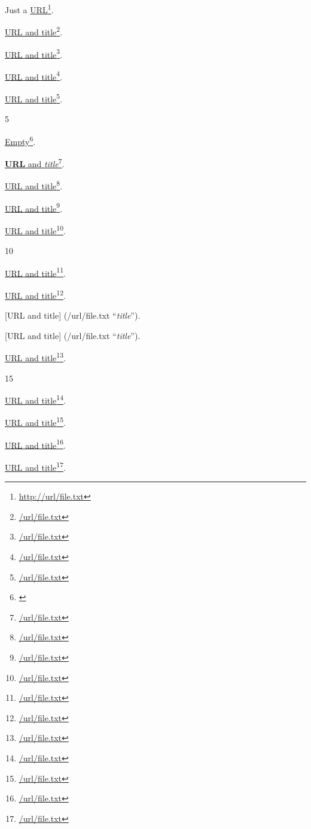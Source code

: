Just a \href{http://url/file.txt}{URL}\footnote{\href{http://url/file.txt}{http:\slash \slash url\slash file.txt}}.

\href{/url/file.txt}{URL and title}\footnote{\href{/url/file.txt}{\slash url\slash file.txt}}.

\href{/url/file.txt}{URL and title}\footnote{\href{/url/file.txt}{\slash url\slash file.txt}}.

\href{/url/file.txt}{URL and title}\footnote{\href{/url/file.txt}{\slash url\slash file.txt}}.

\href{/url/file.txt}{URL and title}\footnote{\href{/url/file.txt}{\slash url\slash file.txt}}.

5

\href{}{Empty}\footnote{\href{}{}}.

\href{/url/file.txt}{\textbf{URL} and \emph{title}}\footnote{\href{/url/file.txt}{\slash url\slash file.txt}}.

\href{/url/file.txt}{URL and title}\footnote{\href{/url/file.txt}{\slash url\slash file.txt}}.

\href{/url/file.txt}{URL and title}\footnote{\href{/url/file.txt}{\slash url\slash file.txt}}.

\href{/url/file.txt}{URL and title}\footnote{\href{/url/file.txt}{\slash url\slash file.txt}}.

10

\href{/url/file.txt}{URL and title}\footnote{\href{/url/file.txt}{\slash url\slash file.txt}}.

\href{/url/file.txt}{URL and title}\footnote{\href{/url/file.txt}{\slash url\slash file.txt}}.

[URL and title] (\slash url\slash file.txt ``\emph{title}'').

[URL and title]
(\slash url\slash file.txt ``\emph{title}'').

\href{/url/file.txt}{URL and title}\footnote{\href{/url/file.txt}{\slash url\slash file.txt}}.

15

\href{/url/file.txt}{URL and title}\footnote{\href{/url/file.txt}{\slash url\slash file.txt}}.

\href{/url/file.txt}{URL and title}\footnote{\href{/url/file.txt}{\slash url\slash file.txt}}.

\href{/url/file.txt}{URL and title}\footnote{\href{/url/file.txt}{\slash url\slash file.txt}}.

\href{/url/file.txt}{URL and title}\footnote{\href{/url/file.txt}{\slash url\slash file.txt}}.
